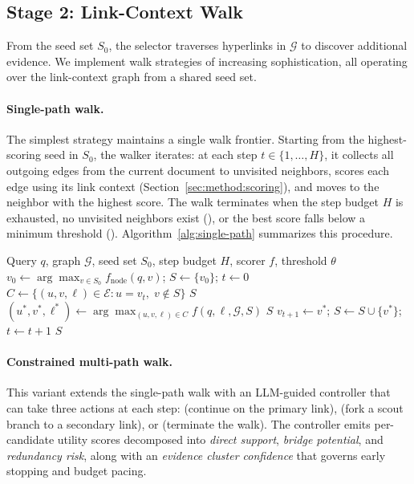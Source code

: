 \subsection{Stage 2: Link-Context Walk}
\label{sec:method:walk}

From the seed set $S_0$, the selector traverses hyperlinks in $\mathcal{G}$ to discover additional evidence. We implement walk strategies of increasing sophistication, all operating over the link-context graph from a shared seed set.

\paragraph{Single-path walk.}
The simplest strategy maintains a single walk frontier. Starting from the highest-scoring seed in $S_0$, the walker iterates: at each step $t \in \{1, \ldots, H\}$, it collects all outgoing edges from the current document to unvisited neighbors, scores each edge using its link context (Section~\ref{sec:method:scoring}), and moves to the neighbor with the highest score. The walk terminates when the step budget $H$ is exhausted, no unvisited neighbors exist (\deadend{}), or the best score falls below a minimum threshold (\scorebelow{}). Algorithm~\ref{alg:single-path} summarizes this procedure.

\begin{algorithm}[t]
\caption{Single-path link-context walk}
\label{alg:single-path}
\begin{algorithmic}[1]
\Require Query $q$, graph $\mathcal{G}$, seed set $S_0$, step budget $H$, scorer $f$, threshold $\theta$
\State $v_0 \gets \arg\max_{v \in S_0} f_{\text{node}}(q, v)$; \quad $S \gets \{v_0\}$; \quad $t \gets 0$
  \State $C \gets \{(u, v, \ell) \in \mathcal{E} : u = v_t,\; v \notin S\}$
    \State \Return $S$ 
  \EndIf
  \State $(u^*, v^*, \ell^*) \gets \arg\max_{(u,v,\ell) \in C} f(q, \ell, \mathcal{G}, S)$
    \State \Return $S$ 
  \EndIf
  \State $v_{t+1} \gets v^*$; \quad $S \gets S \cup \{v^*\}$; \quad $t \gets t + 1$
\EndWhile
\State \Return $S$
\end{algorithmic}
\end{algorithm}

\paragraph{Constrained multi-path walk.}
This variant extends the single-path walk with an LLM-guided controller that can take three actions at each step: \actchooseone{} (continue on the primary link), \actchoosetwo{} (fork a scout branch to a secondary link), or \actstop{} (terminate the walk). The controller emits per-candidate utility scores decomposed into \emph{direct support}, \emph{bridge potential}, and \emph{redundancy risk}, along with an \emph{evidence cluster confidence} that governs early stopping and budget pacing.

